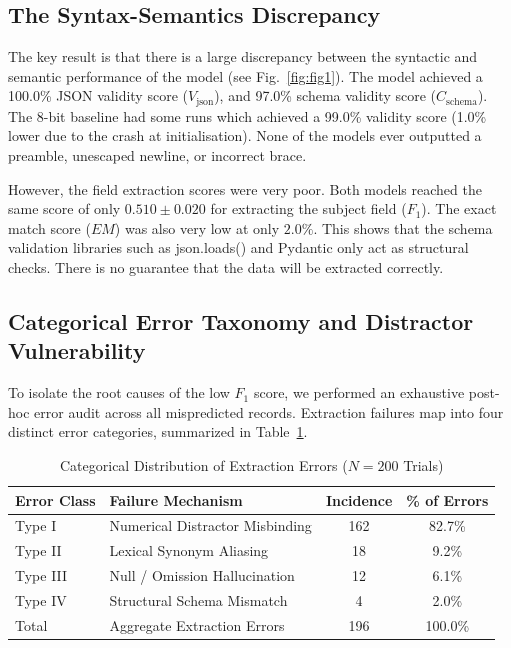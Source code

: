 \documentclass[conference]{IEEEtran}
\begin{document}
{\subsection{The Syntax-Semantics Discrepancy}
The key result is that there is a large discrepancy between the syntactic and semantic performance of the model (see Fig.~\ref{fig:fig1}). The model achieved a 100.0\% JSON validity score ($V_{\text{json}}$), and 97.0\% schema validity score ($C_{\text{schema}}$). The 8-bit baseline had some runs which achieved a 99.0\% validity score (1.0\% lower due to the crash at initialisation). None of the models ever outputted a preamble, unescaped newline, or incorrect brace.

However, the field extraction scores were very poor. Both models reached the same score of only $\mathbf{0.510 \pm 0.020}$ for extracting the subject field ($F_1$). The exact match score ($EM$) was also very low at only $\mathbf{2.0\%}$. This shows that the schema validation libraries such as json.loads() and Pydantic only act as structural checks. There is no guarantee that the data will be extracted correctly.

\subsection{Categorical Error Taxonomy and Distractor Vulnerability}
To isolate the root causes of the low $F_1$ score, we performed an exhaustive post-hoc error audit across all mispredicted records. Extraction failures map into four distinct error categories, summarized in Table~\ref{tab:error_taxonomy}.

\begin{table}[htbp]
\caption{Categorical Distribution of Extraction Errors ($N = 200$ Trials)}
\centering
\footnotesize %
\setlength{\tabcolsep}{4pt} %
\begin{tabular}{llcc}
\toprule
\textbf{Error Class} & \textbf{Failure Mechanism} & \textbf{Incidence} & \textbf{\% of Errors} \\
\midrule
Type I & Numerical Distractor Misbinding & 162 & 82.7\% \\
Type II & Lexical Synonym Aliasing & 18 & 9.2\% \\
Type III & Null / Omission Hallucination & 12 & 6.1\% \\
Type IV & Structural Schema Mismatch & 4 & 2.0\% \\
\midrule
Total & Aggregate Extraction Errors & 196 & 100.0\% \\
\bottomrule
\end{tabular}
\label{tab:error_taxonomy}
\end{table}

}
\end{document}
